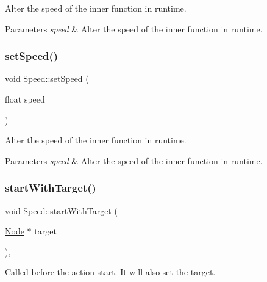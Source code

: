 Alter the speed of the inner function in runtime.


\begin{DoxyParams}{Parameters}
{\em speed} & Alter the speed of the inner function in runtime. \\
\hline
\end{DoxyParams}
\mbox{\label{classSpeed_ae2405e5be01d9c31ca97281088f70edf}} 
\subsubsection{\texorpdfstring{set\+Speed()}{setSpeed()}\hspace{0.1cm}{\footnotesize\ttfamily [2/2]}}
{\footnotesize\ttfamily void Speed\+::set\+Speed (\begin{DoxyParamCaption}\item[{float}]{speed }\end{DoxyParamCaption})\hspace{0.3cm}{\ttfamily [inline]}}

Alter the speed of the inner function in runtime.


\begin{DoxyParams}{Parameters}
{\em speed} & Alter the speed of the inner function in runtime. \\
\hline
\end{DoxyParams}
\mbox{\label{classSpeed_aba4c99e1a403b7966e03a05110c2647f}} 
\subsubsection{\texorpdfstring{start\+With\+Target()}{startWithTarget()}\hspace{0.1cm}{\footnotesize\ttfamily [1/2]}}
{\footnotesize\ttfamily void Speed\+::start\+With\+Target (\begin{DoxyParamCaption}\item[{\hyperlink{classNode}{Node} $\ast$}]{target }\end{DoxyParamCaption})\hspace{0.3cm}{\ttfamily [override]}, {\ttfamily [virtual]}}

Called before the action start. It will also set the target.


